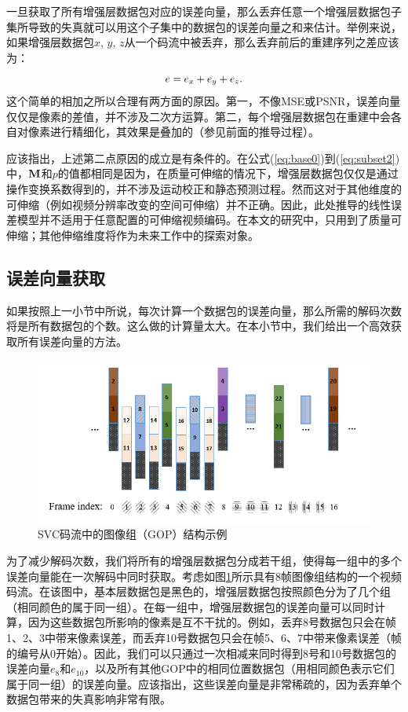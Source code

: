 一旦获取了所有增强层数据包对应的误差向量，那么丢弃任意一个增强层数据包子集所导致的失真就可以用这个子集中的数据包的误差向量之和来估计。举例来说，如果增强层数据包$x$, $y$, $z$从一个码流中被丢弃，那么丢弃前后的重建序列之差应该为：
\begin{equation}
\vspace{10pt}
e = e_x + e_y + e_z.
\end{equation}
这个简单的相加之所以合理有两方面的原因。第一，不像MSE或PSNR，误差向量仅仅是像素的差值，并不涉及二次方运算。第二，每个增强层数据包在重建中会各自对像素进行精细化，其效果是叠加的（参见前面的推导过程）。

应该指出，上述第二点原因的成立是有条件的。在公式(\ref{eq:base0})到(\ref{eq:subset2})中，${\rm\bf M}$和$p$的值都相同是因为，在质量可伸缩的情况下，增强层数据包仅仅是通过操作变换系数得到的，并不涉及运动校正和静态预测过程。然而这对于其他维度的可伸缩（例如视频分辨率改变的空间可伸缩）并不正确。因此，此处推导的线性误差模型并不适用于任意配置的可伸缩视频编码。在本文的研究中，只用到了质量可伸缩；其他伸缩维度将作为未来工作中的探索对象。

\subsection{误差向量获取}

如果按照上一小节中所说，每次计算一个数据包的误差向量，那么所需的解码次数将是所有数据包的个数。这么做的计算量太大。在本小节中，我们给出一个高效获取所有误差向量的方法。

\begin{figure}[h]
\centering
\vspace{10pt}
\includegraphics[width = 1.0\linewidth]{figures/GOP-structure.png}
\caption{SVC码流中的图像组（GOP）结构示例 \label{fig:GOP-structure}}
\end{figure}

为了减少解码次数，我们将所有的增强层数据包分成若干组，使得每一组中的多个误差向量能在一次解码中同时获取。考虑如图\ref{fig:GOP-structure}所示具有8帧图像组结构的一个视频码流。在该图中，基本层数据包是黑色的，增强层数据包按照颜色分为了几个组（相同颜色的属于同一组）。在每一组中，增强层数据包的误差向量可以同时计算，因为这些数据包所影响的像素是互不干扰的。例如，丢弃8号数据包只会在帧1、2、3中带来像素误差，而丢弃10号数据包只会在帧5、6、7中带来像素误差（帧的编号从0开始）。因此，我们可以只通过一次相减来同时得到8号和10号数据包的误差向量$e_{8}$和$e_{10}$，以及所有其他GOP中的相同位置数据包（用相同颜色表示它们属于同一组）的误差向量。应该指出，这些误差向量是非常稀疏的，因为丢弃单个数据包带来的失真影响非常有限。

